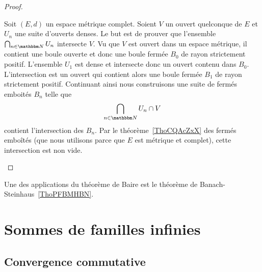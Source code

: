 \begin{proof}
    \begin{subproof}
    \item[Espaces topologiques localement compacts]
        \item[Espaces métriques complets]
            Soit \( (E,d)\) un espace métrique complet. Soient \( V\) un ouvert quelconque de \( E\) et \( U_n\) une suite d'ouverts denses. Le but est de prouver que l'ensemble \( \bigcap_{n\in \eN}U_n\) intersecte \( V\). Vu que \( V\) est ouvert dans un espace métrique, il contient une boule ouverte et donc une boule fermée \( B_0\) de rayon strictement positif. L'ensemble \( U_1\) est dense et intersecte donc un ouvert contenu dans \( B_0\). L'intersection est un ouvert qui contient alors une boule fermée \( B_1\) de rayon strictement positif. Continuant ainsi nous construisons une suite de fermés emboités \( B_n\) telle que
            \begin{equation}
                \bigcap_{n\in \eN}U_n\cap V
            \end{equation}
            contient l'intersection des \( B_n\). Par le théorème~\ref{ThoCQAcZxX} des fermés emboîtés (que nous utilisons parce que \( E\) est métrique et complet), cette intersection est non vide.
        \item[Ouvert d'un espace de Baire]
    \end{subproof}
\end{proof}

Une des applications du théorème de Baire est le théorème de Banach-Steinhaus~\ref{ThoPFBMHBN}.


\section{Sommes de familles infinies}
\label{SECooHHDXooUgLhHR}

\subsection{Convergence commutative}

